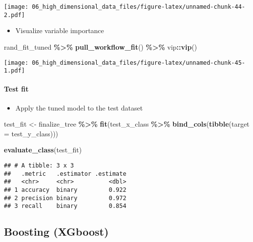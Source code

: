\documentclass[
]{book}
\newenvironment{Shaded}{\begin{snugshade}}{\end{snugshade}}
\newcommand{\DataTypeTok}[1]{\textcolor[rgb]{0.13,0.29,0.53}{#1}}
\newcommand{\KeywordTok}[1]{\textcolor[rgb]{0.13,0.29,0.53}{\textbf{#1}}}
\newcommand{\NormalTok}[1]{#1}
\newcommand{\OperatorTok}[1]{\textcolor[rgb]{0.81,0.36,0.00}{\textbf{#1}}}
\newcommand{\StringTok}[1]{\textcolor[rgb]{0.31,0.60,0.02}{#1}}
\providecommand{\tightlist}{%
  \setlength{\itemsep}{0pt}\setlength{\parskip}{0pt}}
\begin{document}
\texttt{[image: 06\_high\_dimensional\_data\_files/figure-latex/unnamed-chunk-44-2.pdf]}

\begin{itemize}
\tightlist
\item
  Visualize variable importance
\end{itemize}

\begin{Shaded}
\begin{Highlighting}[]
\NormalTok{rand\_fit\_tuned }\OperatorTok{\%\textgreater{}\%}
\StringTok{  }\KeywordTok{pull\_workflow\_fit}\NormalTok{() }\OperatorTok{\%\textgreater{}\%}
\StringTok{  }\NormalTok{vip}\OperatorTok{::}\KeywordTok{vip}\NormalTok{()}
\end{Highlighting}
\end{Shaded}

\texttt{[image: 06\_high\_dimensional\_data\_files/figure-latex/unnamed-chunk-45-1.pdf]}

\hypertarget{test-fit-2}{%
\paragraph{Test fit}\label{test-fit-2}}

\begin{itemize}
\tightlist
\item
  Apply the tuned model to the test dataset
\end{itemize}

\begin{Shaded}
\begin{Highlighting}[]
\NormalTok{test\_fit \textless{}{-}}\StringTok{ }\NormalTok{finalize\_tree }\OperatorTok{\%\textgreater{}\%}
\StringTok{  }\KeywordTok{fit}\NormalTok{(test\_x\_class }\OperatorTok{\%\textgreater{}\%}\StringTok{ }\KeywordTok{bind\_cols}\NormalTok{(}\KeywordTok{tibble}\NormalTok{(}\DataTypeTok{target =}\NormalTok{ test\_y\_class)))}

\KeywordTok{evaluate\_class}\NormalTok{(test\_fit)}
\end{Highlighting}
\end{Shaded}

\begin{verbatim}
## # A tibble: 3 x 3
##   .metric   .estimator .estimate
##   <chr>     <chr>          <dbl>
## 1 accuracy  binary         0.922
## 2 precision binary         0.972
## 3 recall    binary         0.854
\end{verbatim}

\hypertarget{boosting-xgboost}{%
\subsection{Boosting (XGboost)}\label{boosting-xgboost}}
\end{document}

